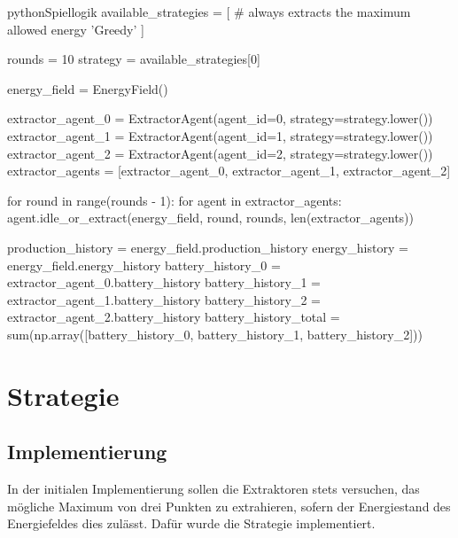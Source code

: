 \begin{snippet}[htb]
    \centering
    \begin{codebox}{python}{Spiellogik}
        available_strategies = [
                # always extracts the maximum allowed energy
                'Greedy'                
            ]

        rounds = 10
        strategy = available_strategies[0]

        energy_field = EnergyField()

        extractor_agent_0 = ExtractorAgent(agent_id=0, strategy=strategy.lower())
        extractor_agent_1 = ExtractorAgent(agent_id=1, strategy=strategy.lower())
        extractor_agent_2 = ExtractorAgent(agent_id=2, strategy=strategy.lower())
        extractor_agents = [extractor_agent_0, extractor_agent_1, extractor_agent_2]

        for round in range(rounds - 1):
            for agent in extractor_agents:
                agent.idle_or_extract(energy_field, round, rounds, len(extractor_agents))

        production_history = energy_field.production_history
        energy_history = energy_field.energy_history
        battery_history_0 = extractor_agent_0.battery_history
        battery_history_1 = extractor_agent_1.battery_history
        battery_history_2 = extractor_agent_2.battery_history
        battery_history_total = sum(np.array([battery_history_0, battery_history_1, battery_history_2]))
    \end{codebox}
    \caption{Implementierung der Spiellogik}
    \label{snippet:02-01_game-logic}
\end{snippet}

\section{ Strategie}
\label{sec:02-02_greedy-strategy}

\subsection{Implementierung}
\label{sec:02-02-01_implementation}

In der initialen Implementierung sollen die Extraktoren stets versuchen, das mögliche Maximum von drei Punkten zu extrahieren, sofern der Energiestand des Energiefeldes dies zulässt. Dafür wurde die Strategie  implementiert.

